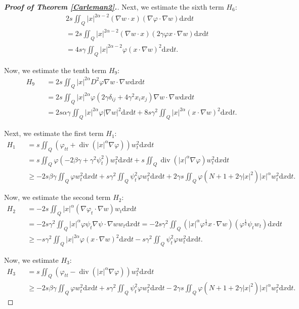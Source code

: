 \documentclass[11pt]{article}
\numberwithin{equation}{section}
\def\vp{\varphi}
\def\bf{\textbf}
\def\al{\alpha}
\def\be{\beta}
\def\de{\delta}
\def\ga{\gamma}
\def\f{\frac}
\def\df{\mathrm d}
\DeclareMathOperator{\Div}{div}
\begin{document}
\begin{proof}[{\rm \bf { Proof of  Theorem \ref{Carleman2}.}}]
			Next, we estimate the sixth term $H_6$:
			\begin{eqnarray*}
				&&2s\iint_Q|x|^{2\al-2}(\nabla w\cdot x)(\nabla \vp\cdot \nabla w)\df x\df t\\
				&&=2s\iint_Q |x|^{2\al-2}(\nabla w\cdot x) (2\ga \vp x\cdot \nabla w)\df x\df t\\
				&&=4s\ga\iint_Q|x|^{2\al-2}\vp (x\cdot \nabla w)^2\df x\df t.
			\end{eqnarray*}
			
			Now, we estimate the tenth term $H_{9}$:
			\begin{eqnarray*}
				H_{9}
				&&=2s\iint_Q|x|^{2\al}D^2\vp\nabla w\cdot \nabla w\df x\df t\\
				&&=2s\iint_Q|x|^{2\al} \vp\left(2\ga \de_{ij}+4\ga^2x_ix_j\right) \nabla w\cdot \nabla w\df x\df t\\
				&&=2s \alpha \ga \iint_Q|x|^{2\al}\vp |\nabla w|^2\df x\df t+8s\ga^2\iint_Q|x|^{2\al}(x\cdot \nabla w)^2\df x\df t.
			\end{eqnarray*}
			
			
			Next, we estimate the first term $H_1$:
			\begin{eqnarray*}
				H_1
				&&=s\iint_Q\left(\vp_{tt}+\Div \left(|x|^\al \nabla\vp\right)\right) w_t^2\df x\df t\\
				&&=s\iint_Q\vp(-2\be\ga+\ga^2\psi_t^2)w_t^2\df x\df t+s\iint_Q\Div(|x|^\al \nabla \vp)w_t^2\df x\df t\\
				&&\geq-2s\be\ga\iint_Q\vp w_t^2\df x\df t+s\ga^2\iint_Q \psi_t^2\vp w_t^2\df x\df t+2\ga s\iint_Q\vp\left(N+1+2\ga |x|^2\right)|x|^\al w_t^2\df x\df t.
			\end{eqnarray*}
			
			
			Now, we estimate the second term $H_2$:
			\begin{eqnarray*}
				H_2
				&&=-2s\iint_Q|x|^\al(\nabla\vp_t \cdot \nabla w) w_t\df x\df t\\
				&&=-2s\ga^2\iint_Q |x|^\al \vp  \psi_t\nabla \psi \cdot \nabla w w_t\df x\df t=-2s\ga^2\iint_Q( |x|^\al \vp^\f{1}{2}x\cdot \nabla w)(\vp^\f{1}{2}\psi_tw_t)\df x\df t \\
				&&\geq -s\ga^2\iint_Q|x|^{2\al}\vp(x\cdot \nabla w)^2\df x\df t-s\ga^2 \iint_Q\psi_t^2 \vp w_t^2\df x\df t.
			\end{eqnarray*}
			
			
			Now, we estimate $H_3$:
			\begin{eqnarray*}
				H_3
				&& =s\iint_Q\left(\vp_{tt}-\Div (|x|^\al \nabla \vp)\right)w_t^2\df x\df t\\
				&&\geq -2s\be\ga \iint_Q\vp w_t^2\df x\df t+s\ga^2\iint_Q \psi_t^2\vp w_t^2\df x\df t-2\ga s\iint_Q\vp\left(N+1+2\ga |x|^2\right)|x|^\al w_t^2\df x\df t.
			\end{eqnarray*}
			

\end{proof}
\end{document}
